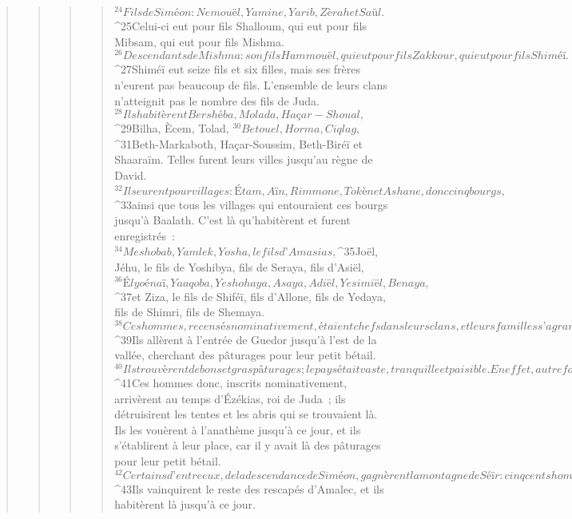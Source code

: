 \begin{verse}
\begin{verse}
\begin{verse}
\begin{verse}
${}^{24}Fils de Siméon : Nemouël, Yamine, Yarib, Zèrah et Saül. 
${}^{25}Celui-ci eut pour fils Shalloum, qui eut pour fils Mibsam, qui eut pour fils Mishma. 
${}^{26}Descendants de Mishma : son fils Hammouël, qui eut pour fils Zakkour, qui eut pour fils Shiméï.
${}^{27}Shiméï eut seize fils et six filles, mais ses frères n’eurent pas beaucoup de fils. L’ensemble de leurs clans n’atteignit pas le nombre des fils de Juda.
${}^{28}Ils habitèrent Bershéba, Molada, Haçar-Shoual, 
${}^{29}Bilha, Ècem, Tolad, 
${}^{30}Betouel, Horma, Ciqlag, 
${}^{31}Beth-Markaboth, Haçar-Soussim, Beth-Biréï et Shaaraïm. Telles furent leurs villes jusqu’au règne de David. 
${}^{32}Ils eurent pour villages : Étam, Aïn, Rimmone, Tokèn et Ashane, donc cinq bourgs, 
${}^{33}ainsi que tous les villages qui entouraient ces bourgs jusqu’à Baalath. C’est là qu’habitèrent et furent enregistrés : 
${}^{34}Meshobab, Yamlek, Yosha, le fils d’Amasias, 
${}^{35}Joël, Jéhu, le fils de Yoshibya, fils de Seraya, fils d’Asiël, 
${}^{36}Élyoénaï, Yaaqoba, Yeshohaya, Asaya, Adiël, Yesimiël, Benaya, 
${}^{37}et Ziza, le fils de Shiféï, fils d’Allone, fils de Yedaya, fils de Shimri, fils de Shemaya. 
${}^{38}Ces hommes, recensés nominativement, étaient chefs dans leurs clans, et leurs familles s’agrandirent beaucoup. 
${}^{39}Ils allèrent à l’entrée de Guedor jusqu’à l’est de la vallée, cherchant des pâturages pour leur petit bétail. 
${}^{40}Ils trouvèrent de bons et gras pâturages ; le pays était vaste, tranquille et paisible. En effet, autrefois y habitaient les descendants de Cham.
${}^{41}Ces hommes donc, inscrits nominativement, arrivèrent au temps d’Ézékias, roi de Juda ; ils détruisirent les tentes et les abris qui se trouvaient là. Ils les vouèrent à l’anathème jusqu’à ce jour, et ils s’établirent à leur place, car il y avait là des pâturages pour leur petit bétail. 
${}^{42}Certains d’entre eux, de la descendance de Siméon, gagnèrent la montagne de Séïr : cinq cents hommes, ayant à leur tête Pelatya, Nearya, Refaya, Ouzziël, les fils de Yishéï. 
${}^{43}Ils vainquirent le reste des rescapés d’Amalec, et ils habitèrent là jusqu’à ce jour.
      

\end{verse}
\end{verse}
\end{verse}
\end{verse}
